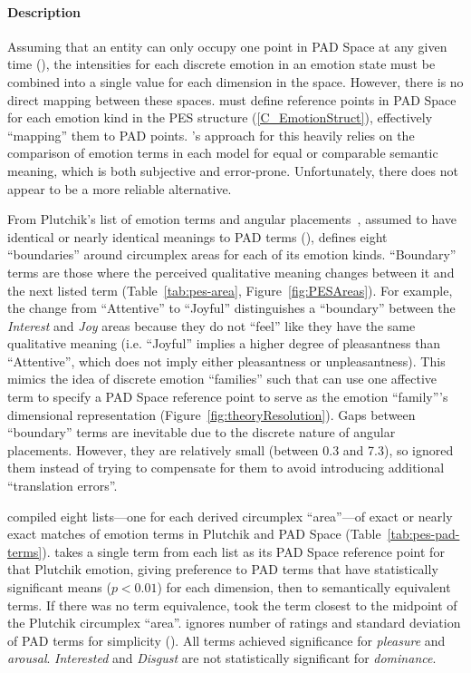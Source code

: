 \paragraph{Description} Assuming that an entity can only occupy one point in
PAD Space at any given time (), the intensities for each
discrete emotion in an emotion state must be combined into a single value for
each dimension in the space. However, there is no direct mapping between these
spaces. \progname{} must define reference points in PAD Space for each emotion
kind in the PES structure (\cref{C_EmotionStruct}), effectively ``mapping'' them
to PAD points. \progname{}'s approach for this heavily relies on the comparison
of emotion terms in each model for equal or comparable semantic meaning, which
is both subjective and error-prone. Unfortunately, there does not appear to be
a more reliable alternative.

From Plutchik's list of emotion terms and angular
placements~\citep[p.~170]{robert1980emotion}, assumed to have identical or
nearly identical meanings to PAD terms (), \progname{}
defines eight ``boundaries'' around circumplex areas for each of its emotion
kinds. ``Boundary'' terms are those where the perceived qualitative meaning
changes between it and the next listed term (Table~\ref{tab:pes-area},
Figure~\ref{fig:PESAreas}). For example, the change from ``Attentive'' to
``Joyful'' distinguishes a ``boundary'' between the \textit{Interest} and
\textit{Joy} areas because they do not ``feel'' like they have the same
qualitative meaning (i.e. ``Joyful'' implies a higher degree of pleasantness
than ``Attentive'', which does not imply either pleasantness or
unpleasantness). This mimics the idea of discrete emotion ``families'' such
that \progname{} can use one affective term to specify a PAD Space reference
point to serve as the emotion ``family'''s dimensional representation
(Figure~\ref{fig:theoryResolution}). Gaps between ``boundary'' terms are
inevitable due to the discrete nature of angular placements. However, they are
relatively small (between 0.3\textdegree{} and 7.3\textdegree{}), so
\progname{} ignored them instead of trying to compensate for them to avoid
introducing additional ``translation errors''.

\progname{} compiled eight lists---one for each derived circumplex
``area''---of exact or nearly exact matches of emotion terms in Plutchik and
PAD Space (Table~\ref{tab:pes-pad-terms}). \progname{} takes a single term from
each list as its PAD Space reference point for that Plutchik emotion, giving
preference to PAD terms that have statistically significant means ($p < 0.01$)
for each dimension, then to semantically equivalent terms. If there was no term
equivalence, \progname{} took the term closest to the midpoint of the Plutchik
circumplex ``area''. \progname{} ignores number of ratings and standard
deviation of PAD terms for simplicity (). All terms achieved
significance for \textit{pleasure} and \textit{arousal}. \textit{Interested}
and \textit{Disgust} are not statistically significant for \textit{dominance}.

